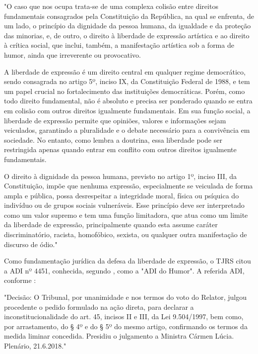 \noindent
\begin{flushleft}
	\setlength{\leftskip}{4cm}
	\small
	"O caso que nos ocupa trata-se de uma complexa colisão entre direitos fundamentais consagrados pela Constituição da República, na qual se enfrenta, de um lado, o princípio da dignidade da pessoa humana, da igualdade e da proteção das minorias, e, de outro, o direito à liberdade de expressão artística e ao direito à crítica social, que inclui, também, a manifestação artística sob a forma de humor, ainda que irreverente ou provocativo.
	
	A liberdade de expressão é um direito central em qualquer regime democrático, sendo consagrada no artigo 5º, inciso IX, da Constituição Federal de 1988, e tem um papel crucial no fortalecimento das instituições democráticas. Porém, como todo direito fundamental, não é absoluto e precisa ser ponderado quando se entra em colisão com outros direitos igualmente fundamentais. Em sua função social, a liberdade de expressão permite que opiniões, valores e informações sejam veiculados, garantindo a pluralidade e o debate necessário para a convivência em sociedade. No entanto, como lembra a doutrina, essa liberdade pode ser restringida apenas quando entrar em conflito com outros direitos igualmente fundamentais.
	
	O direito à dignidade da pessoa humana, previsto no artigo 1º, inciso III, da Constituição, impõe que nenhuma expressão, especialmente se veiculada de forma ampla e pública, possa desrespeitar a integridade moral, física ou psíquica do indivíduo ou de grupos sociais vulneráveis. Esse princípio deve ser interpretado como um valor supremo e tem uma função limitadora, que atua como um limite da liberdade de expressão, principalmente quando esta assume caráter discriminatório, racista, homofóbico, sexista, ou qualquer outra manifestação de discurso de ódio." \cite{liberdade_expressao_artistica_tjrs}
\end{flushleft}

Como fundamentação jurídica da defesa da liberdade de expressão, o TJRS citou a ADI nº 4451, conhecida, segundo \cite{liberdade_expressao_artistica_tjrs}, como a "ADI do Humor". A referida ADI, conforme \cite{adi_4451}:

\noindent
\begin{flushleft}
	\setlength{\leftskip}{4cm}
	\small
	"Decisão: O Tribunal, por unanimidade e nos termos do voto do Relator, julgou procedente o pedido formulado na ação direta, para declarar a inconstitucionalidade do art. 45, incisos II e III, da Lei 9.504/1997, bem como, por arrastamento, do § 4º e do § 5º do mesmo artigo, confirmando os termos da medida liminar concedida. Presidiu o julgamento a Ministra Cármen Lúcia. Plenário, 21.6.2018." \cite{adi_4451}
\end{flushleft}  

